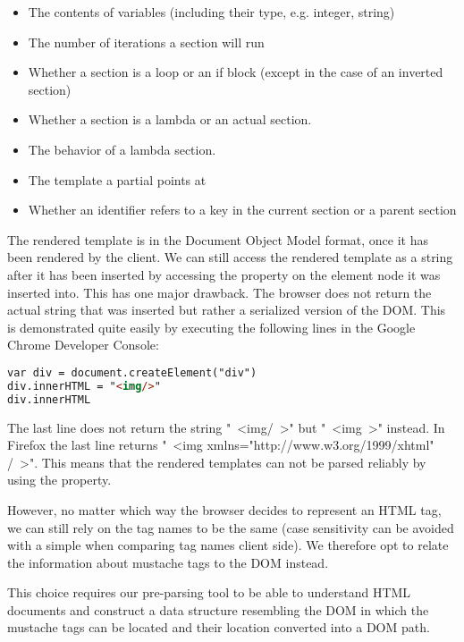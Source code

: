 \documentclass[thesis.tex]{subfiles}
\begin{document}
\begin{itemize}
\item The contents of variables (including their type, e.g. integer, string)
\item The number of iterations a section will run
\item Whether a section is a loop or an if block
      (except in the case of an inverted section)
\item Whether a section is a lambda or an actual section.
\item The behavior of a lambda section.
\item The template a partial points at
\item Whether an identifier refers to a key in the current section or
      a parent section
\end{itemize}

The rendered template is in the Document Object Model format, once it has
been rendered by the client. We can still access the rendered template as a
string after it has been inserted by accessing the  property
on the element node it was inserted into. This has one major drawback.
The browser does not return the actual string that was inserted but rather a
serialized version of the DOM. This is demonstrated quite easily by executing
the following lines in the Google Chrome Developer Console:
\begin{lstlisting}[language=HTML]
var div = document.createElement("div")
div.innerHTML = "<img/>"
div.innerHTML
\end{lstlisting}

The last line does not return the string "\ <img/\ >" but "\ <img\ >" instead.
In Firefox the last line returns "\ <img xmlns="http://www.w3.org/1999/xhtml" /\ >".
This means that the rendered templates can not be parsed reliably by using the
 property.

However, no matter which way the browser decides to represent an HTML tag,
we can still rely on the tag names to be the same
(case sensitivity can be avoided with a simple
 when comparing tag names client side).
We therefore opt to relate the information about mustache tags to the DOM instead.

This choice requires our pre-parsing tool to be able to understand
HTML documents and construct a data structure resembling the DOM in which the
mustache tags can be located and their location converted into a DOM path.
\end{document}
